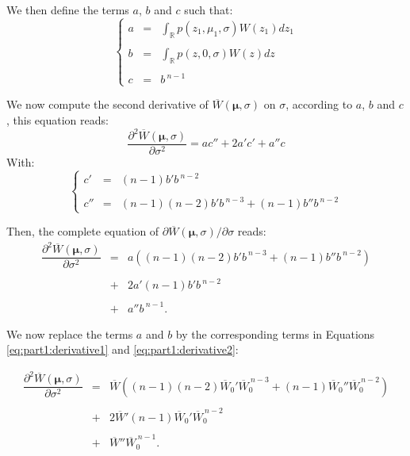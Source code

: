 We then define the terms $a$, $b$ and $c$ such that:
\begin{equation}
\left\{
\begin{array}{ccl}
a & = & \displaystyle\int_{\mathbb{R}} p(z_1,\mu_1,\sigma)W(z_1)dz_1\\\\
b & = & \displaystyle\int_{\mathbb{R}} p(z,0,\sigma)W(z)dz\\\\
c & = & b^{\ n-1}
\end{array}
\right.
\end{equation}

We now compute the second derivative of $\overline{W}(\boldsymbol{\mu}, \sigma)$ on $\sigma$, according to $a$, $b$ and $c$, this equation reads:
\begin{equation}
\dfrac{\partial^2 \overline{W}(\boldsymbol{\mu}, \sigma)}{\partial \sigma^2} = ac'' + 2a'c' + a''c
\end{equation}
With:
\begin{equation}
\left\{
\begin{array}{ccl}
c' & = & (n-1)b'b^{\ n-2}\\\\
c'' & = & (n-1)(n-2)b'b^{\ n-3} + (n-1)b''b^{\ n-2}
\end{array}
\right.
\end{equation}

Then, the complete equation of $\partial \overline{W}(\boldsymbol{\mu}, \sigma) / \partial \sigma$ reads:
\begin{equation}
\begin{array}{rcl}
\dfrac{\partial^2 \overline{W}(\boldsymbol{\mu}, \sigma)}{\partial \sigma^2} & = & a \left( (n-1)(n-2)b'b^{\ n-3} + (n-1)b''b^{\ n-2} \right)\\\\
& + & 2a'(n-1)b'b^{\ n-2}\\\\
& + & a''b^{\ n-1}.
\end{array}
\end{equation}

We now replace the terms $a$ and $b$ by the corresponding terms in Equations \ref{eq:part1:derivative1} and \ref{eq:part1:derivative2}:

\begin{equation}
\begin{array}{rcl}
\dfrac{\partial^2 \overline{W}(\boldsymbol{\mu}, \sigma)}{\partial \sigma^2} & = & \overline{W} \left( (n-1)(n-2)\overline{W}_0'\overline{W}_0^{\ n-3} + (n-1)\overline{W}_0''\overline{W}_0^{\ n-2} \right)\\\\
& + & 2\overline{W}'(n-1)\overline{W}_0'\overline{W}_0^{\ n-2}\\\\
& + & \overline{W}''\overline{W}_0^{\ n-1}.
\end{array}
\end{equation}

